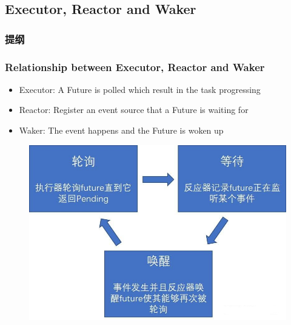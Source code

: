 \subsection{Executor, Reactor and Waker}
\begin{frame}
\frametitle{提纲} %
\tableofcontents %

\end{frame}
\begin{frame}[fragile]
    \frametitle{Relationship between Executor, Reactor and Waker}
% 
            \begin{itemize}
                \item {\color{red}Executor}: A Future is polled which result in the task progressing
                \item {\color{red}Reactor}: Register an event source that a Future is waiting for
                \item {\color{red}Waker}: The event happens and the Future is woken up
            \end{itemize}
% 
    \begin{figure}
    \includegraphics[width=0.5\linewidth]{figs/future-loop.jpg}
    \end{figure}
% 
\end{frame}
